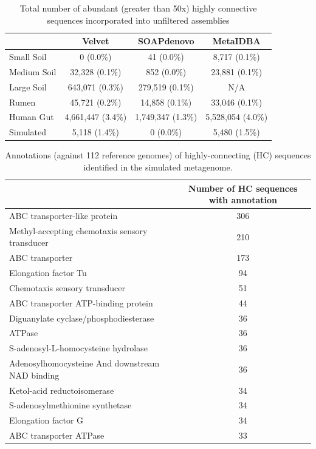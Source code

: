 \documentclass[10pt]{article}
\begin{document}
\begin{table}[h]
\caption{Total number of abundant (greater than 50x) highly connective sequences incorporated into unfiltered assemblies}
\begin{tabular}{l c c c}
 & Velvet & SOAPdenovo & MetaIDBA  \\
\hline
Small Soil & 0 (0.0\%) & 41 (0.0\%) & 8,717 (0.1\%) \\
Medium Soil &  32,328 (0.1\%) & 852 (0.0\%) & 23,881 (0.1\%) \\
Large Soil & 643,071 (0.3\%) & 279,519 (0.1\%) & N/A \\
Rumen & 45,721 (0.2\%) & 14,858 (0.1\%) & 33,046 (0.1\%) \\
Human Gut & 4,661,447 (3.4\%) & 1,749,347 (1.3\%) & 5,528,054 (4.0\%) \\
Simulated & 5,118 (1.4\%) & 0 (0.0\%) & 5,480 (1.5\%) \\
\hline
\end{tabular}
\label{assembly-stoptags}
\end{table}

\begin{table}
\caption{Annotations (against 112 reference genomes) of highly-connecting (HC) sequences identified in the simulated metagenome.}
\begin{tabular}{l c}
\hline
& Number of HC sequences with annotation\\
\hline
ABC transporter-like protein	&306\\
Methyl-accepting chemotaxis sensory transducer	&210\\
ABC transporter	&173\\
Elongation factor Tu	&94\\
Chemotaxis sensory transducer	&51\\
ABC transporter ATP-binding protein	&44\\
Diguanylate cyclase/phosphodiesterase	&36\\
ATPase	&36\\
S-adenosyl-L-homocysteine hydrolase	&36\\
Adenosylhomocysteine And downstream NAD binding	&36\\
Ketol-acid reductoisomerase	&34\\
S-adenosylmethionine synthetase	&34\\
Elongation factor G	&34\\
ABC transporter ATPase	&33\\
\end{tabular}
\label{sim-stoptags}
\end{table}
\end{document}
